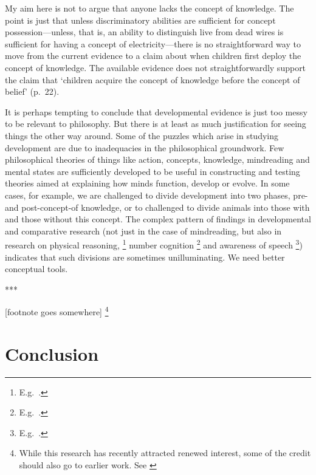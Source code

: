 \documentclass[11pt,a4paper]{extarticle}
\begin{document}
My aim here is not to argue that anyone lacks the concept of knowledge.
The point is just that unless discriminatory abilities are sufficient for  concept possession---unless, that is, an ability to distinguish live from dead wires is sufficient for having a concept of electricity---there is no straightforward way to move from the current evidence to a claim about when children first deploy the concept of knowledge.
The available evidence does not  straightforwardly support the claim that `children acquire the concept of knowledge before the concept of belief' (p.\ 22).

It is perhaps tempting to conclude that developmental evidence is just too messy to be relevant to philosophy.
But there is at least as much justification for seeing things the other way around.
Some of the puzzles which arise in studying development are due to inadequacies in the philosophical groundwork.
Few philosophical theories of things like action, concepts, knowledge, mindreading and mental states are sufficiently developed to be useful in constructing and testing theories aimed at explaining 
 how minds function, develop or evolve.
In some cases, for example, we are challenged to divide development into two phases, pre- and post-concept-of knowledge, or to challenged to divide animals into those with and those without this concept.
The complex pattern of findings in developmental and comparative research (not just in the case of mindreading, but also in research on physical reasoning,%
\footnote{
E.g.\ \citet{Berthier:2000eu,Baillargeon:2002hb,Hood:2003yg}.
}
number cognition%
\footnote{
E.g.\ \citet{Xu:2003qw,feigenson_limits_2005,gallistel_non-verbal_2000,gelman_number_2005}.
}
and awareness of speech%
\footnote{
E.g.\ \citet{Eimas:1971cp,Jusczyk:1995it,Anthony:2004yp,Liberman:1990mo}.
}) 
indicates that such divisions are sometimes unilluminating.
We need better conceptual tools.


***

[footnote goes somewhere]%
\footnote{
While this research has recently attracted renewed interest, some of the credit should also go to earlier work. 
See \citet{Clements:1994cw,Garnham:2001jm,Garnham:2001ql,Ruffman:2001ng}
}


%

\section{Conclusion}
\end{document}
